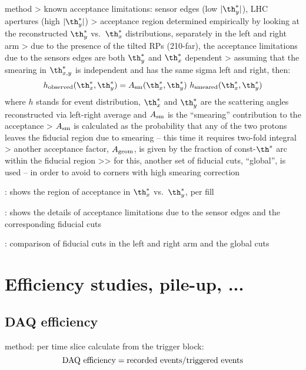 \> method
\>> known acceptance limitations: sensor edges (low $|\th_y^*|$), LHC apertures (high $|\th_y^*|$)
\>> acceptance region determined empirically by looking at the reconstructed $\th_y^*$ vs.~$\th_x^*$ distributions, separately in the left and right arm
\>> due to the presence of the tilted RPs (210-far), the acceptance limitations due to the sensors edges are both $\th_y^*$ and $\th_x^*$ dependent
\>> assuming that the smearing in $\th_{x, y}^*$ is independent and has the same sigma left and right, then:
$$h_{\rm observed}(\th_x^*, \th_y^*) = A_{\rm sm}(\th_x^*, \th_y^*)\ h_{\rm smeared}(\th_x^*, \th_y^*)$$
where $h$ stands for event distribution, $\th_x^*$ and $\th_y^*$ are the scattering angles reconstructed via left-right average and $A_{\rm sm}$ is the ``smearing'' contribution to the acceptance
\>> $A_{\rm sm}$ is calculated as the probability that any of the two protons leaves the fiducial region due to smearing -- this time it requires two-fold integral
\>> another acceptance factor, $A_{\rm geom}$, is given by the fraction of const-$\th^*$ arc within the fiducial region
\>>> for this, another set of fiducial cuts, ``global'', is used -- in order to avoid to corners with high smearing correction

\> : shows the region of acceptance in $\th_x^*$ vs.~$\th_y^*$, per fill

\> : shows the details of acceptance limitations due to the sensor edges and the corresponding fiducial cuts

\> : comparison of fiducial cuts in the left and right arm and the global cuts





\section{Efficiency studies, pile-up, ...}

\subsection{DAQ efficiency}

\> method: per time slice calculate from the trigger block:
$$\hbox{DAQ efficiency} = \hbox{recorded events} / \hbox{triggered events}$$


